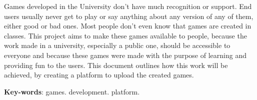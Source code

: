 \begin{resumo}[Abstract]
   Games developed in the University don't have much recognition or support. End users usually never get to play or say anything about any version of any of them, either good or bad ones. Most people don't even know that games are created in classes. This project aims to make these games available to people, because the work made in a university, especially a public one, should be accessible to everyone and because these games were made with the purpose of learning and providing fun to the users. This document outlines how this work will be achieved, by creating a platform to upload the created games.

   \vspace{\onelineskip}

   \noindent
   \textbf{Key-words}: games. development. platform.
\end{resumo}
